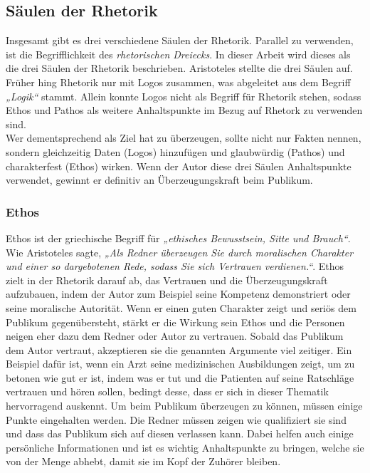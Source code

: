 \subsection{Säulen der Rhetorik}
\label{sec: Säulen der Rhetorik}
Insgesamt gibt es drei verschiedene Säulen der Rhetorik. Parallel zu verwenden, ist die Begrifflichkeit 
des \textit{rhetorischen Dreiecks}. In dieser Arbeit wird dieses als die drei Säulen der Rhetorik beschrieben. 
Aristoteles stellte die drei Säulen auf.
\\Früher hing Rhetorik nur mit Logos zusammen, was abgeleitet aus dem Begriff \textit{„Logik“} stammt. 
Allein konnte Logos nicht als Begriff für Rhetorik stehen, sodass Ethos und Pathos als weitere 
Anhaltspunkte im Bezug auf Rhetork zu verwenden sind. 
\\Wer dementsprechend als Ziel hat zu überzeugen, sollte nicht nur Fakten nennen, sondern gleichzeitig  
Daten (Logos) hinzufügen und glaubwürdig (Pathos) und charakterfest (Ethos) wirken. Wenn der 
Autor diese drei Säulen \bzw Anhaltspunkte verwendet, gewinnt er definitiv an Überzeugungskraft 
beim Publikum.

\subsubsection{Ethos}
Ethos ist der griechische Begriff für \textit{„ethisches Bewusstsein, Sitte und Brauch“}. Wie 
Aristoteles sagte, \textit{„Als Redner überzeugen Sie durch moralischen Charakter und einer so dargebotenen 
Rede, sodass Sie sich Vertrauen verdienen.“}. Ethos zielt in der Rhetorik darauf ab, das Vertrauen 
und die Überzeugungskraft aufzubauen, indem der Autor zum Beispiel seine Kompetenz demonstriert oder 
seine moralische Autorität. Wenn er einen guten Charakter zeigt und seriös dem Publikum gegenübersteht, 
stärkt er die Wirkung sein Ethos und die Personen neigen eher dazu dem Redner oder Autor zu vertrauen. 
Sobald das Publikum dem Autor vertraut, akzeptieren sie die genannten Argumente viel zeitiger. Ein 
Beispiel dafür ist, wenn ein Arzt seine medizinischen Ausbildungen zeigt, um zu betonen wie gut er ist, 
indem was er tut und die Patienten auf seine Ratschläge vertrauen und hören sollen, bedingt desse, dass er sich in dieser Thematik hervorragend auskennt. Um beim Publikum überzeugen zu können, müssen  einige Punkte eingehalten werden. Die Redner müssen zeigen wie qualifiziert sie sind und dass das Publikum sich auf 
diesen verlassen kann. Dabei helfen auch einige persönliche Informationen und ist es wichtig 
Anhaltspunkte zu bringen, welche sie von der Menge abhebt, damit sie im Kopf der Zuhörer bleiben. 

